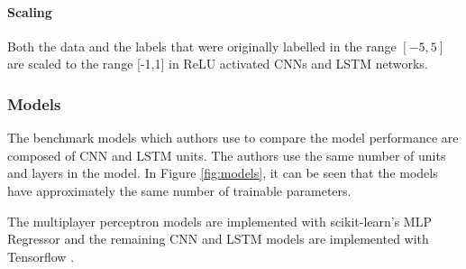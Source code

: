 \documentclass[a4paper,11pt]{article}
\begin{document}
\paragraph{Scaling}
Both the data and the labels that were originally labelled in the range $[-5,5]$ are scaled to the range [-1,1] in ReLU activated CNNs and LSTM networks. 

\subsubsection{Models}

The benchmark models which authors use to compare the model performance are composed of CNN and LSTM units. The authors use the same number of units and layers in the model. In Figure \ref{fig:models}, it can be seen that the models have approximately the same number of trainable parameters. 

The multiplayer perceptron models are implemented with scikit-learn's MLP Regressor \cite{scikit-learn} and the remaining CNN and LSTM models are implemented with Tensorflow \cite{tensorflow2015-whitepaper}.
\end{document}
